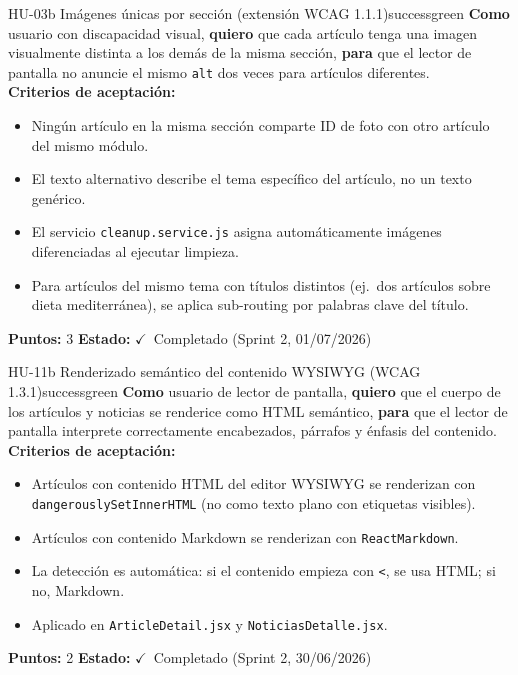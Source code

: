 \documentclass[12pt, a4paper]{article}
\newcommand{\cmark}{\textcolor{successgreen}{$\checkmark$}}
\begin{document}
\begin{storybox}{HU-03b \quad Imágenes únicas por sección (extensión WCAG 1.1.1)}{successgreen}
\textbf{Como} usuario con discapacidad visual,
\textbf{quiero} que cada artículo tenga una imagen visualmente distinta a los demás de la misma sección,
\textbf{para} que el lector de pantalla no anuncie el mismo \texttt{alt} dos veces para artículos diferentes.\\[4pt]
\textbf{Criterios de aceptación:}
\begin{itemize}
  \item Ningún artículo en la misma sección comparte ID de foto con otro artículo del mismo módulo.
  \item El texto alternativo describe el tema específico del artículo, no un texto genérico.
  \item El servicio \texttt{cleanup.service.js} asigna automáticamente imágenes diferenciadas al ejecutar limpieza.
  \item Para artículos del mismo tema con títulos distintos (ej.~dos artículos sobre dieta mediterránea), se aplica sub-routing por palabras clave del título.
\end{itemize}
\textbf{Puntos:} 3 \quad \textbf{Estado:} \cmark~Completado (Sprint 2, 01/07/2026)
\end{storybox}

\begin{storybox}{HU-11b \quad Renderizado semántico del contenido WYSIWYG (WCAG 1.3.1)}{successgreen}
\textbf{Como} usuario de lector de pantalla,
\textbf{quiero} que el cuerpo de los artículos y noticias se renderice como HTML semántico,
\textbf{para} que el lector de pantalla interprete correctamente encabezados, párrafos y énfasis del contenido.\\[4pt]
\textbf{Criterios de aceptación:}
\begin{itemize}
  \item Artículos con contenido HTML del editor WYSIWYG se renderizan con \texttt{dangerouslySetInnerHTML} (no como texto plano con etiquetas visibles).
  \item Artículos con contenido Markdown se renderizan con \texttt{ReactMarkdown}.
  \item La detección es automática: si el contenido empieza con \texttt{<}, se usa HTML; si no, Markdown.
  \item Aplicado en \texttt{ArticleDetail.jsx} y \texttt{NoticiasDetalle.jsx}.
\end{itemize}
\textbf{Puntos:} 2 \quad \textbf{Estado:} \cmark~Completado (Sprint 2, 30/06/2026)
\end{storybox}
\end{document}
